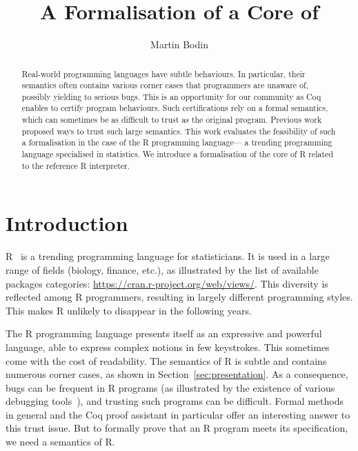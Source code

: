 \documentclass[9pt, sigplan, natbib=false, screen=true]{acmart}
\title{A \Coq{} Formalisation of a Core of \R{}}
\author{Martin Bodin}
\affiliation{
    \institution{Center of Mathematical Modeling}
    \streetaddress{Beauchef 851}
    \city{Santiago}
    \country{Chile}
}
\newcommand\Coq{Coq}
\newcommand\R{R}
\begin{document}
\begin{abstract}
Real-world programming languages have subtle behaviours.
In particular, their semantics often contains various corner cases
that programmers are unaware of,
possibly yielding to serious bugs.
This is an opportunity for our community
as \Coq{} enables to certify program behaviours.
Such certifications rely on a formal semantics,
which can sometimes be as difficult to trust as the original program.
Previous work proposed ways to trust such large semantics.
This work evaluates the feasibility of such a formalisation
in the case of the \R{} programming language---%
a trending programming language specialised in statistics.
We introduce a formalisation of the core of \R{}
related to the reference \R{} interpreter.
\end{abstract}

\maketitle

\section{Introduction}
\label{sec:introduction}

\R{}~\parencite{R, ihaka1996r, Rwebsite} is a trending
programming language for statisticians.
It is used in a large range of fields (biology, finance, etc.),
as illustrated by the list of available packages categories:
\url{https://cran.r-project.org/web/views/}.
This diversity is reflected among \R{} programmers,
resulting in largely different programming styles.
This makes \R{} unlikely to disappear
in the following years.

The \R{} programming language presents itself
as an expressive and powerful language,
able to express complex notions in few keystrokes.
This sometimes come with the cost of readability.
The semantics of \R{} is subtle
and contains numerous corner cases,
as shown in Section~\ref{sec:presentation}.
%
As a consequence, bugs can be frequent in \R{} programs
(as illustrated by the existence of various debugging tools~\parencite{mcpherson2014}),
and trusting such programs can be difficult.
Formal methods in general and the \Coq{} proof assistant in particular
offer an interesting answer to this trust issue.
But to formally prove that an \R{} program meets its specification,
we need a semantics of \R{}.
\end{document}
